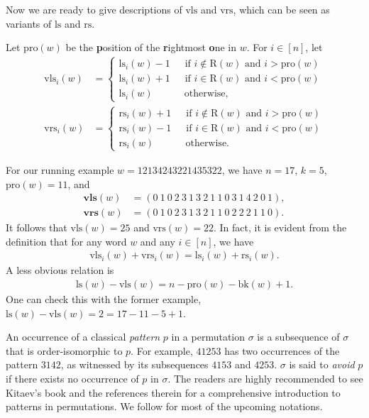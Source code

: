 \documentclass[12pt]{amsart}
\numberwithin{equation}{section}
\theoremstyle{plain}
\theoremstyle{definition}
\def\bk{\mathrm{bk}}
\def\ls{\mathrm{ls}}
\def\rs{\mathrm{rs}}
\def\wrs{\mathrm{vrs}}
\def\wls{\mathrm{vls}}
\def\pl{\mathrm{pro}}
\def\RR{\mathrm{R}}
\def\bwls{\mathbf{vls}}
\def\bwrs{\mathbf{vrs}}
\begin{document}
Now we are ready to give descriptions of $\wls$ and $\wrs$, which can be seen as variants of $\ls$ and $\rs$.







Let $\pl(w)$ be the {\bf p}osition of the {\bf r}ightmost {\bf o}ne in $w$.
For $i \in [n]$, let
\begin{align*}
  \wls_i(w)&=\left\{
  \begin{array}{ll}
\ls_i(w)-1  \,\,\,\,\,\,\,\,\,  \mbox{if $i \notin \RR(w)$ and $i > \pl(w)$}\\[5pt]
\ls_i(w)+1  \,\,\,\,\,\,\,\,\,\mbox{if $i \in \RR(w)$ and $i < \pl(w)$}\\[5pt]
\ls_i(w)  \,\,\,\,\,\,\,\,\,\,\,\,\,\,\,\,\,\,\,  \mbox{otherwise,}
 \end{array} \right. \\[5pt]
   \wrs_i(w)&=\left\{
  \begin{array}{ll}
\rs_i(w)+1  \,\,\,\,\,\,\,\,\,  \mbox{if $i \notin \RR(w)$ and $i > \pl(w)$}\\[5pt]
\rs_i(w)-1  \,\,\,\,\,\,\,\,\,\mbox{if $i \in \RR(w)$ and $i < \pl(w)$}\\[5pt]
\rs_i(w)  \,\,\,\,\,\,\,\,\,\,\,\,\,\,\,\,\,\,\,  \mbox{otherwise.}
 \end{array} \right.
\end{align*}







For our running example $w=12134243221435322$, we have $n=17$, $k=5$, $\pl(w)=11$, and
\begin{align*}
  \bwls(w)&= (0~1~0~2~3~1~3~2~1~1~0~3~1~4~2~0~1), \\[5pt]
  \bwrs(w)&= (0~1~0~2~3~1~3~2~1~1~0~2~2~2~1~1~0).
\end{align*}
It follows that $\wls(w)=25$ and $\wrs(w)=22$.
In fact, it is evident from the definition that for any word $w$ and any $i\in[n]$, we have
\begin{align}\label{wls+wrs}
\wls_i(w)+\wrs_i(w)=\ls_i(w)+\rs_i(w).
\end{align}
A less obvious relation is
\begin{align}\label{def-wls}
\ls(w)-\wls(w)=n-\pl(w)-\bk(w)+1.
\end{align}
One can check this with the former example, $\ls(w)-\wls(w)=2=17-11-5+1$.



An occurrence of a classical \emph{pattern} $p$ in a permutation $\sigma$ is a subsequence of $\sigma$ that is order-isomorphic to $p$. For example, $41253$ has two occurrences of the pattern $3142$, as witnessed by its subsequences $4153$ and $4253$. $\sigma$ is said to \emph{avoid} $p$ if there exists no occurrence of $p$ in $\sigma$. The readers are highly recommended to see Kitaev's book \cite{Kit} and the references therein for a comprehensive introduction to patterns in permutations. We follow \cite{Kit} for most of the upcoming notations.
\end{document}
